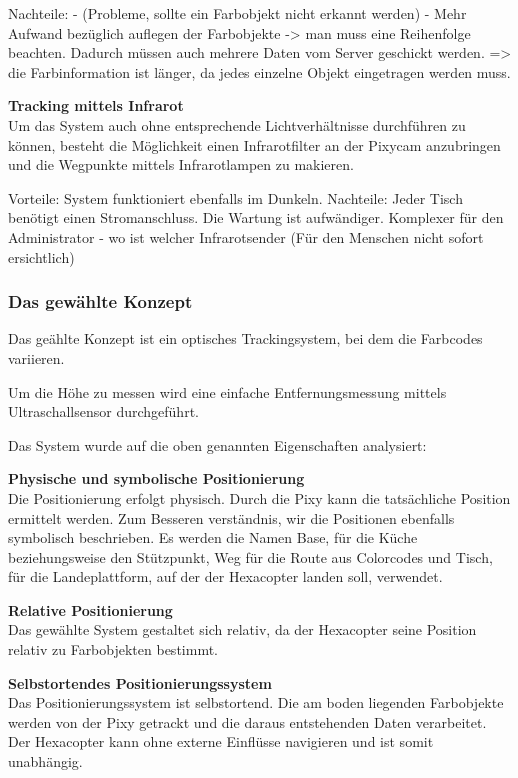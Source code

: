   Nachteile:
  - (Probleme, sollte ein Farbobjekt nicht erkannt werden)
  - Mehr Aufwand bezüglich auflegen der Farbobjekte -> man muss eine Reihenfolge beachten. Dadurch müssen auch mehrere Daten vom Server geschickt werden. => die Farbinformation ist länger, da jedes einzelne Objekt eingetragen werden muss. 



  \textbf{Tracking mittels Infrarot}\\
  Um das System auch ohne entsprechende Lichtverhältnisse durchführen zu können, besteht die Möglichkeit einen Infrarotfilter an der Pixycam anzubringen und die Wegpunkte mittels Infrarotlampen zu makieren. 

  Vorteile:
  System funktioniert ebenfalls im Dunkeln.
  Nachteile: 
  Jeder Tisch benötigt einen Stromanschluss.
  Die Wartung ist aufwändiger.
  Komplexer für den Administrator - wo ist welcher Infrarotsender (Für den Menschen nicht sofort ersichtlich)


  \subsubsection{Das gewählte Konzept}

  Das geählte Konzept ist ein optisches Trackingsystem, bei dem die Farbcodes variieren.

  Um die Höhe zu messen wird eine einfache Entfernungsmessung mittels Ultraschallsensor durchgeführt.

  Das System wurde auf die oben genannten Eigenschaften analysiert:

  \textbf{Physische und symbolische Positionierung}\\
  Die Positionierung erfolgt physisch. Durch die Pixy kann die tatsächliche Position ermittelt werden.
  Zum Besseren verständnis, wir die Positionen ebenfalls symbolisch beschrieben. Es werden die Namen Base, für die Küche beziehungsweise den Stützpunkt, Weg für die Route aus Colorcodes und Tisch, für die Landeplattform, auf der der Hexacopter landen soll, verwendet.

  \textbf{Relative Positionierung}\\
  Das gewählte System gestaltet sich relativ, da der Hexacopter seine Position relativ zu Farbobjekten bestimmt.

  \textbf{Selbstortendes Positionierungssystem}\\
  Das Positionierungssystem ist selbstortend. Die am boden liegenden Farbobjekte werden von der Pixy getrackt und die daraus entstehenden Daten verarbeitet. Der Hexacopter kann ohne externe Einflüsse navigieren und ist somit unabhängig.

